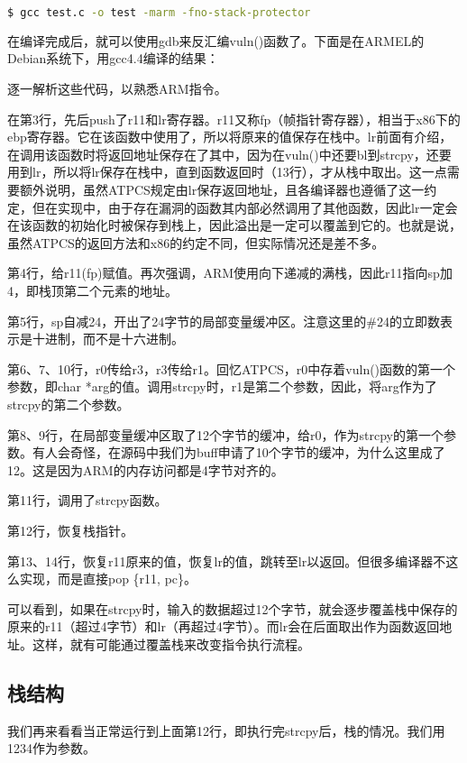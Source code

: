 \begin{lstlisting}[language=bash, numbers=none]
  $ gcc test.c -o test -marm -fno-stack-protector
\end{lstlisting}

在编译完成后，就可以使用gdb来反汇编vuln()函数了。下面是在ARMEL的Debian系统下，用gcc4.4编译的结果：



逐一解析这些代码，以熟悉ARM指令。

在第3行，先后push了r11和lr寄存器。r11又称fp（帧指针寄存器），相当于x86下的ebp寄存器。它在该函数中使用了，所以将原来的值保存在栈中。lr前面有介绍，在调用该函数时将返回地址保存在了其中，因为在vuln()中还要bl到strcpy，还要用到lr，所以将lr保存在栈中，直到函数返回时（13行），才从栈中取出。这一点需要额外说明，虽然ATPCS规定由lr保存返回地址，且各编译器也遵循了这一约定，但在实现中，由于存在漏洞的函数其内部必然调用了其他函数，因此lr一定会在该函数的初始化时被保存到栈上，因此溢出是一定可以覆盖到它的。也就是说，虽然ATPCS的返回方法和x86的约定不同，但实际情况还是差不多。

第4行，给r11(fp)赋值。再次强调，ARM使用向下递减的满栈，因此r11指向sp加4，即栈顶第二个元素的地址。

第5行，sp自减24，开出了24字节的局部变量缓冲区。注意这里的\#24的立即数表示是十进制，而不是十六进制。

第6、7、10行，r0传给r3，r3传给r1。回忆ATPCS，r0中存着vuln()函数的第一个参数，即char *arg的值。调用strcpy时，r1是第二个参数，因此，将arg作为了strcpy的第二个参数。

第8、9行，在局部变量缓冲区取了12个字节的缓冲，给r0，作为strcpy的第一个参数。有人会奇怪，在源码中我们为buff申请了10个字节的缓冲，为什么这里成了12。这是因为ARM的内存访问都是4字节对齐的。

第11行，调用了strcpy函数。

第12行，恢复栈指针。

第13、14行，恢复r11原来的值，恢复lr的值，跳转至lr以返回。但很多编译器不这么实现，而是直接pop \{r11, pc\}。

可以看到，如果在strcpy时，输入的数据超过12个字节，就会逐步覆盖栈中保存的原来的r11（超过4字节）和lr（再超过4字节）。而lr会在后面取出作为函数返回地址。这样，就有可能通过覆盖栈来改变指令执行流程。

\subsection{栈结构}
我们再来看看当正常运行到上面第12行，即执行完strcpy后，栈的情况。我们用1234作为参数。

